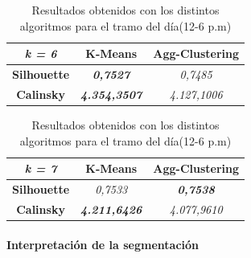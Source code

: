 \begin{table}[H]
\begin{subtable}[H]{0.45\textwidth}
\begin{tabular}{|c|c|c|}
\hline
\textit{k = 6}      & \textbf{K-Means}             & \textbf{Agg-Clustering} \\ \hline
\textbf{Silhouette} & \textit{\textbf{0,7527}}     & \textit{0,7485}         \\ \hline
\textbf{Calinsky}   & \textit{\textbf{4.354,3507}} & \textit{4.127,1006}     \\ \hline
\end{tabular}
\end{subtable}
\begin{subtable}[H]{0.45\textwidth}
        \centering
\begin{tabular}{|c|c|c|}
\hline
\textit{k = 7}      & \textbf{K-Means}             & \textbf{Agg-Clustering}  \\ \hline
\textbf{Silhouette} & \textit{0,7533}              & \textit{\textbf{0,7538}} \\ \hline
\textbf{Calinsky}   & \textit{\textbf{4.211,6426}} & \textit{4.077,9610}      \\ \hline
\end{tabular}
\end{subtable}
\hfill
\caption{Resultados obtenidos con los distintos algoritmos para el tramo del día(12-6 p.m)}
\end{table}

\paragraph{Interpretación de la segmentación}

